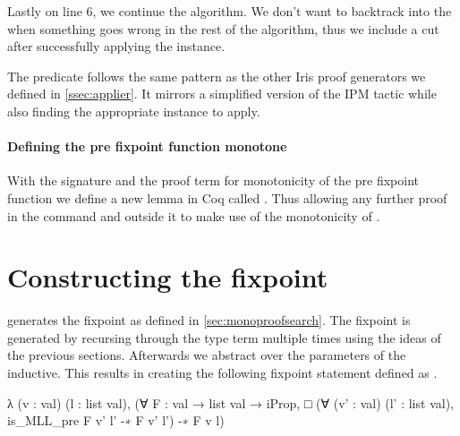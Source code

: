 \documentclass[thesis.tex]{subfiles}
\begin{document}
Lastly on line 6, we continue the algorithm. We don't want to backtrack into the  when something goes wrong in the rest of the algorithm, thus we include a cut after successfully applying the  instance.

The predicate  follows the same pattern as the other Iris proof generators we defined in \cref{ssec:applier}. It mirrors a simplified version of the IPM  tactic while also finding the appropriate  instance to apply.

\paragraph{Defining the pre fixpoint function monotone}
With the signature and the proof term for monotonicity of the pre fixpoint function we define a new lemma in Coq called . Thus allowing any further proof in the command and outside it to make use of the monotonicity of .

\section{Constructing the fixpoint}\label{sec:constrfixpoint}
 generates the fixpoint as defined in \cref{sec:monoproofsearch}. The fixpoint is generated by recursing through the type term multiple times using the ideas of the previous sections. Afterwards we abstract over the parameters of the inductive. This results in creating the following fixpoint statement defined as .
\begin{coqcode}
  λ (v : val) (l : list val),
    (∀ F : val → list val → iProp, 
      □ (∀ (v' : val) (l' : list val), 
            is_MLL_pre F v' l' -∗ F v' l') 
      -∗ F v l)
\end{coqcode}
\end{document}
